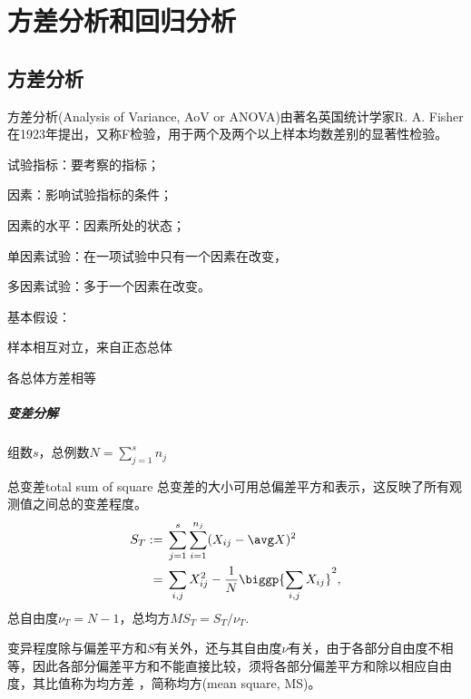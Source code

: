\chapter{方差分析和回归分析}

\section{方差分析}

方差分析(Analysis of Variance, AoV or ANOVA)由著名英国统计学家R. A. Fisher在1923年提出，又称F检验，用于两个及两个以上样本均数差别的显著性检验。

\begin{definition}{}{}
	试验指标：要考察的指标；

	因素：影响试验指标的条件；

	因素的水平：因素所处的状态；
	
	单因素试验：在一项试验中只有一个因素在改变，

	多因素试验：多于一个因素在改变。
\end{definition}

基本假设：
\begin{compactenum}
	\item 样本相互对立，来自正态总体
	\item 各总体方差相等
\end{compactenum}

\paragraph{变差分解}

组数$s$，总例数$N=\textstyle\sum_{j=1}^sn_j$

\begin{definition}{总变差}{total sum of square}
	总变差的大小可用总偏差平方和表示，这反映了所有观测值之间总的变差程度。
	\begin{subequations}
		\begin{align}
			S_T:={}&\sum_{j=1}^s\sum_{i=1}^{n_j}(X_{ij}-\avg X)^2\\\notag
			={}&\sum_{i,j}X_{ij}^2-\frac1N\biggp{\sum_{i,j}X_{ij}}^2,
		\end{align}
	\end{subequations}
	总自由度$\nu_T=N-1$，总均方$MS_T=S_T/\nu_T.$
\end{definition}

变异程度除与偏差平方和$S$有关外，还与其自由度$\nu$有关，由于各部分自由度不相等，因此各部分偏差平方和不能直接比较，须将各部分偏差平方和除以相应自由度，其比值称为均方差 ，简称均方(mean square, MS)。

